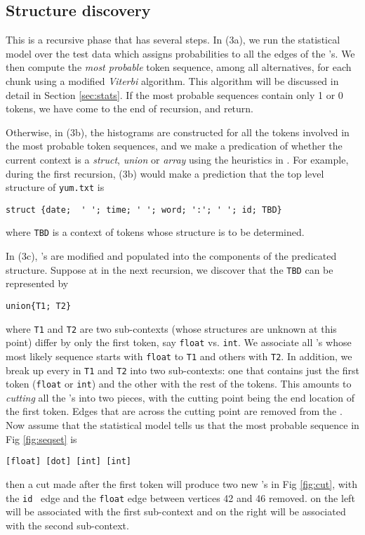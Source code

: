 \subsection{Structure discovery}
This is a recursive phase that has several steps.
In (3a), we run the statistical model over the test data
which assigns probabilities to all the edges of the \seqset's.
We then compute the {\em most probable} token sequence, among all alternatives,
for each chunk using a modified {\em Viterbi} algorithm. This algorithm
will be discussed in detail in Section \ref{sec:stats}.
If the most probable sequences contain only 1 or 0 tokens, we have come to
the end of recursion, and return.

Otherwise, in (3b), the histograms are constructed for
all the tokens involved in the most probable token sequences, and we
make a predication of whether the current context is a {\em struct},
{\em union} or {\em array} using the heuristics in \cite{fisher+:dirttoshovels}. 
For example, during the first recursion, 
(3b) would make a prediction that the top level structure of
{\tt yum.txt} is 

{\small 
\begin{verbatim}
struct {date;  ' '; time; ' '; word; ':'; ' '; id; TBD}
\end{verbatim}
}
\noindent
where {\tt TBD} is a context of tokens whose structure is to be determined.

In (3c), \seqset's are modified and populated into the components of
the predicated structure. Suppose at in the next recursion, 
we discover that the {\tt TBD} can be represented by
{\small 
\begin{verbatim}
union{T1; T2}
\end{verbatim}
}
\noindent
where {\tt T1} and {\tt T2} are two sub-contexts 
(whose structures are unknown at this
point) differ by only the first token, 
say {\tt float} vs. {\tt int}. We associate all 
\seqset's whose most likely sequence starts with {\tt float} to {\tt T1} and others with
{\tt T2}. In addition, we break up every \seqset{} in {\tt T1} and {\tt T2} into two sub-contexts:
one that contains just the first token ({\tt float} or {\tt int}) and the other with the rest 
of the tokens.  This amounts to {\em cutting} all the \seqset's into two pieces, 
with the cutting point being the end location of the first token. Edges that are across
the cutting point are removed from the \seqset. Now assume that the statistical
model tells us that the most probable sequence in Fig \ref{fig:seqset} is 
{\small
\begin{verbatim}
[float] [dot] [int] [int]
\end{verbatim}
}
\noindent
then a cut made after the first token will produce two new \seqset's in
Fig \ref{fig:cut}, with the {\tt id}~ edge and the {\tt float} edge between
vertices 42 and 46 removed. \seqset{} on the left will be associated with
the first sub-context and \seqset{} on the right will be associated with the
second sub-context.

